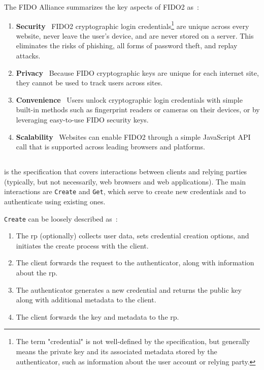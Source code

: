 The FIDO Alliance summarizes the key aspects of FIDO2 as~\cite{fido:fido2}:

\begin{enumerate}
	\item \textbf{Security} \textendash\ FIDO2 cryptographic login credentials\footnote{
			The term "credential" is not well-defined by the specification, but generally means the private key
			and its associated metadata stored by the authenticator, such as information about the user account or relying party.
		} are unique across every website, never leave the user’s device, and are never stored on a server.
		This eliminates the risks of phishing, all forms of password theft, and replay attacks.
	\item \textbf{Privacy} \textendash\ Because FIDO cryptographic keys are unique for each internet site, they cannot be used to track users across sites.
	\item \textbf{Convenience} \textendash\ Users unlock cryptographic login credentials with simple
		built-in methods such as fingerprint readers or cameras on their devices, or by leveraging easy-to-use FIDO security keys.
	\item \textbf{Scalability} \textendash\ Websites can enable FIDO2 through a simple JavaScript API call that is supported across leading browsers and platforms.
\end{enumerate}\medskip

\subsection{}\label{subsec:webauthn}

 is the specification that covers interactions between clients and relying parties
(typically, but not necessarily, web browsers and web applications). The main interactions are
\texttt{Create} and \texttt{Get}, which serve to create new credentials and to
authenticate using existing ones.

\texttt{Create} can be loosely described as~\cite{fido:webautn}:

\begin{enumerate}
	\item The \gls{rp} (optionally) collects user data, sets credential creation options, and initiates the create process with the \gls{client}.
	\item The \gls{client} forwards the request to the authenticator, along with information about the \gls{rp}.
	\item The \gls{authenticator} generates a new credential and returns the public key along with additional metadata to the \gls{client}.
	\item The \gls{client} forwards the key and metadata to the \gls{rp}.
\end{enumerate}

